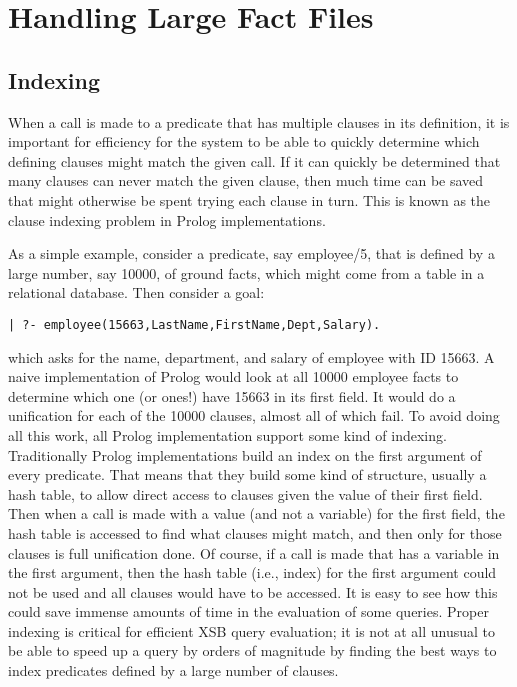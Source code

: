 \chapter{Handling Large Fact Files}

\section{Indexing}

When a call is made to a predicate that has multiple clauses in its
definition, it is important for efficiency for the system to be able
to quickly determine which defining clauses might match the given
call.  If it can quickly be determined that many clauses can never
match the given clause, then much time can be saved that might
otherwise be spent trying each clause in turn.  This is known as the
clause indexing problem in Prolog implementations.

As a simple example, consider a predicate, say employee/5, that is
defined by a large number, say 10000, of ground facts, which might
come from a table in a relational database.  Then consider a goal:
\begin{verbatim}
| ?- employee(15663,LastName,FirstName,Dept,Salary).
\end{verbatim}
which asks for the name, department, and salary of employee with ID
15663.  A naive implementation of Prolog would look at all 10000
employee facts to determine which one (or ones!) have 15663 in its
first field.  It would do a unification for each of the 10000 clauses,
almost all of which fail.  To avoid doing all this work, all Prolog
implementation support some kind of indexing.  Traditionally Prolog
implementations build an index on the first argument of every
predicate.  That means that they build some kind of structure, usually
a hash table, to allow direct access to clauses given the value of
their first field.  Then when a call is made with a value (and not a
variable) for the first field, the hash table is accessed to find what
clauses might match, and then only for those clauses is full
unification done.  Of course, if a call is made that has a variable in
the first argument, then the hash table (i.e., index) for the first
argument could not be used and all clauses would have to be accessed.
It is easy to see how this could save immense amounts of time in the
evaluation of some queries.  Proper indexing is critical for efficient
XSB query evaluation; it is not at all unusual to be able to speed up
a query by orders of magnitude by finding the best ways to index
predicates defined by a large number of clauses.

